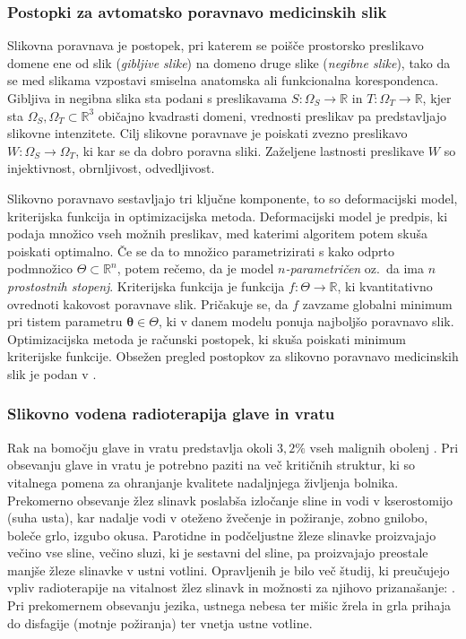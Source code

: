 \documentclass[a4paper,twoside,11pt]{article}
\begin{document}
	\subsubsection*{Postopki za avtomatsko poravnavo medicinskih slik}
	\par{
	  Slikovna poravnava je postopek, pri katerem se poišče prostorsko preslikavo domene ene od slik (\emph{gibljive slike}) na domeno druge slike (\emph{negibne slike}), tako da se med slikama vzpostavi smiselna anatomska ali funkcionalna korespondenca. Gibljiva in negibna slika sta podani s preslikavama $S\colon\Omega_S\rightarrow\mathbb{R}$ in $T\colon\Omega_T\rightarrow\mathbb{R}$, kjer sta $\Omega_S, \Omega_T\subset\mathbb{R}^3$ običajno kvadrasti domeni, vrednosti preslikav pa predstavljajo slikovne intenzitete. Cilj slikovne poravnave je poiskati zvezno preslikavo $W:\Omega_S\rightarrow\Omega_T$, ki kar se da dobro poravna sliki. Zaželjene lastnosti preslikave $W$ so injektivnost, obrnljivost, odvedljivost.
	}
	\par{
	  Slikovno poravnavo sestavljajo tri ključne komponente, to so deformacijski model, kriterijska funkcija in optimizacijska metoda. Deformacijski model je predpis, ki podaja množico vseh možnih preslikav, med katerimi algoritem potem skuša poiskati optimalno. Če se da to množico parametrizirati s kako odprto podmnožico $\Theta\subset\mathbb{R}^n$, potem rečemo, da je model \emph{$n$-parametričen} oz.~da ima \emph{$n$ prostostnih stopenj}. Kriterijska funkcija je funkcija $f\colon\Theta\rightarrow\mathbb{R}$, ki kvantitativno ovrednoti kakovost poravnave slik. Pričakuje se, da $f$ zavzame globalni minimum pri tistem parametru $\mathbf{\theta}\in\Theta$, ki v danem modelu ponuja najboljšo poravnavo slik. Optimizacijska metoda je računski postopek, ki skuša poiskati minimum kriterijske funkcije. Obsežen pregled postopkov za slikovno poravnavo medicinskih slik je podan v \cite{sotiras2013}.
	}
	\subsubsection*{Slikovno vodena radioterapija glave in vratu}
	\par{
	  Rak na bomočju glave in vratu predstavlja okoli $3,2\%$ vseh malignih obolenj \cite{torre2015}. Pri obsevanju glave in vratu je potrebno paziti na več kritičnih struktur, ki so vitalnega pomena za ohranjanje kvalitete nadaljnjega življenja bolnika. Prekomerno obsevanje žlez slinavk poslabša izločanje sline in vodi v kserostomijo (suha usta), kar nadalje vodi v oteženo žvečenje in požiranje, zobno gnilobo, boleče grlo, izgubo okusa. Parotidne in podčeljustne žleze slinavke proizvajajo večino vse sline, večino sluzi, ki je sestavni del sline, pa proizvajajo preostale manjše žleze slinavke v ustni votlini. Opravljenih je bilo več študij, ki preučujejo vpliv radioterapije na vitalnost žlez slinavk in možnosti za njihovo prizanašanje: \cite{bhide2009,beetz2012,marzi2012,lee2014,yuan2014,vanluijk2015,tuomikoski2015,eisbruch2009}. Pri prekomernem obsevanju jezika, ustnega nebesa ter mišic žrela in grla prihaja do disfagije (motnje požiranja) ter vnetja ustne votline.
	}
	  
\end{document}
